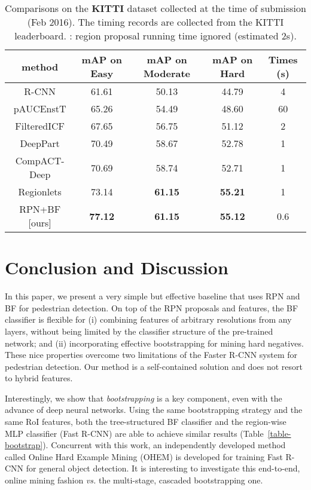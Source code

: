 \documentclass[runningheads]{llncs}
\def\vs{\emph{vs. }}
\begin{document}
\begin{table}[t]
\begin{center}
\begin{tabular}{c|c|c|c|c}
\hline
method & mAP  on Easy &  mAP on  Moderate & mAP on  Hard & Times (s) \\
\hline\hline
R-CNN & 61.61 & 50.13 & 44.79 & 4 \\
pAUCEnstT & 65.26 & 54.49 & 48.60 & 60 \\
FilteredICF & 67.65 & 56.75 & 51.12 & 2 \\
DeepPart & 70.49 & 58.67 & 52.78 & 1 \\
CompACT-Deep & 70.69 & 58.74 & 52.71 & 1 \\
Regionlets & 73.14 & \textbf{61.15} & \textbf{55.21} & 1 \\
\hline
RPN+BF [ours]  & \textbf{77.12} & \textbf{61.15} & \textbf{55.12} & 0.6 \\
\hline
\end{tabular}
\end{center}
\caption{Comparisons on the \textbf{KITTI} dataset collected at the time of submission (Feb 2016). The timing records are collected from the KITTI leaderboard. : region proposal running time ignored (estimated 2s).}
\label{table-kitti}
\end{table}


\section{Conclusion and Discussion}

In this paper, we present a very simple but effective baseline that uses RPN and BF for pedestrian detection. On top of the RPN proposals and features, the BF classifier is flexible for (i) combining features of arbitrary resolutions from any layers, without being limited by the classifier structure of the pre-trained network; and (ii) incorporating effective bootstrapping for mining hard negatives. These nice properties overcome two limitations of the Faster R-CNN system for pedestrian detection. Our method is a self-contained solution and does not resort to hybrid features.

Interestingly, we show that \emph{bootstrapping} is a key component, even with the advance of deep neural networks. Using the same bootstrapping strategy and the same RoI features, both the tree-structured BF classifier and the region-wise MLP classifier (Fast R-CNN) are able to achieve similar results (Table~\ref{table-bootstrap}).
Concurrent with this work, an independently developed method called Online Hard Example Mining (OHEM) \cite{shrivastava2016training} is developed for training Fast R-CNN for general object detection. It is interesting to investigate this end-to-end, online mining fashion \vs the multi-stage, cascaded bootstrapping one.
\end{document}
